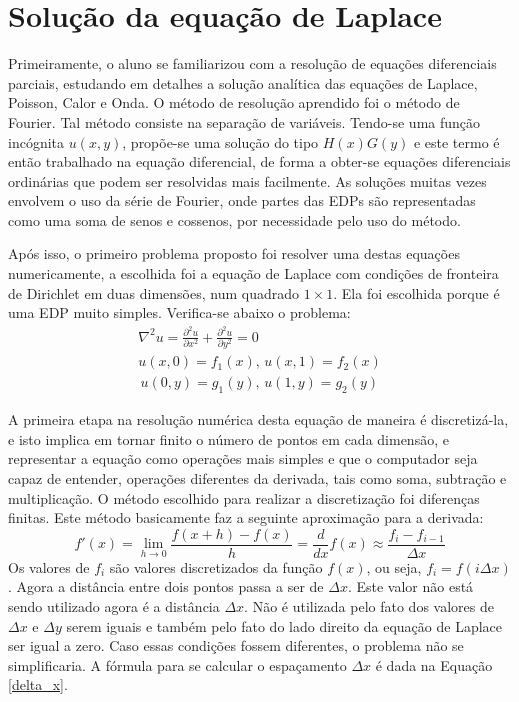 \documentclass[journal]{IEEEtran}
\begin{document}
\section{Solução da equação de Laplace}
Primeiramente, o aluno se familiarizou com a resolução de equações diferenciais parciais, estudando em detalhes a solução analítica das equações de Laplace, Poisson, Calor e Onda. O método de resolução aprendido foi o método de Fourier. Tal método consiste na separação de variáveis. Tendo-se uma função incógnita $u(x,y)$, propõe-se uma solução do tipo $H(x)G(y)$ e este termo é então trabalhado na equação diferencial, de forma a obter-se equações diferenciais ordinárias que podem ser resolvidas mais facilmente. As soluções muitas vezes envolvem o uso da série de Fourier, onde partes das EDPs são representadas como uma soma de senos e cossenos, por necessidade pelo uso do método.

Após isso, o primeiro problema proposto foi resolver uma destas equações numericamente, a escolhida foi a equação de Laplace com condições de fronteira de Dirichlet em duas dimensões, num quadrado $1\times 1$. Ela foi escolhida porque é uma EDP muito simples. Verifica-se abaixo o problema:
\begin{eqnarray}
\nabla^2 u=\frac{\partial^2 u}{\partial x^2}+\frac{\partial^2 u}{\partial y^2}=0\label{laplace}\\
u(x,0)=f_1(x),\,u(x,1)=f_2(x)\nonumber \\
\,u(0,y)=g_1(y),\,u(1,y)=g_2(y) \nonumber
\end{eqnarray}

A primeira etapa na resolução numérica desta equação de maneira é discretizá-la, e isto implica em tornar finito o número de pontos em cada dimensão, e representar a equação como operações mais simples e que o computador seja capaz de entender, operações diferentes da derivada, tais como soma, subtração e multiplicação. O método escolhido para realizar a discretização foi diferenças finitas. Este método basicamente faz a seguinte aproximação para a derivada:
\begin{equation}
f'(x)=\lim_{h\rightarrow 0}\frac{f(x+h)-f(x)}{h}=\frac{d}{dx}f(x)\approx \frac{f_i-f_{i-1}}{\Delta x}
\end{equation}
Os valores de $f_i$ são valores discretizados da função $f(x)$, ou seja, $f_i=f(i\Delta x)$. Agora a distância entre dois pontos passa a ser de $\Delta x$. Este valor não está sendo utilizado agora é a distância $\Delta x$. Não é utilizada pelo fato dos valores de $\Delta x$ e $\Delta y$ serem iguais e também pelo fato do lado direito da equação de Laplace ser igual a zero. Caso essas condições fossem diferentes, o problema não se simplificaria. A fórmula para se calcular o espaçamento $\Delta x$ é dada na Equação \ref{delta_x}.
\end{document}
